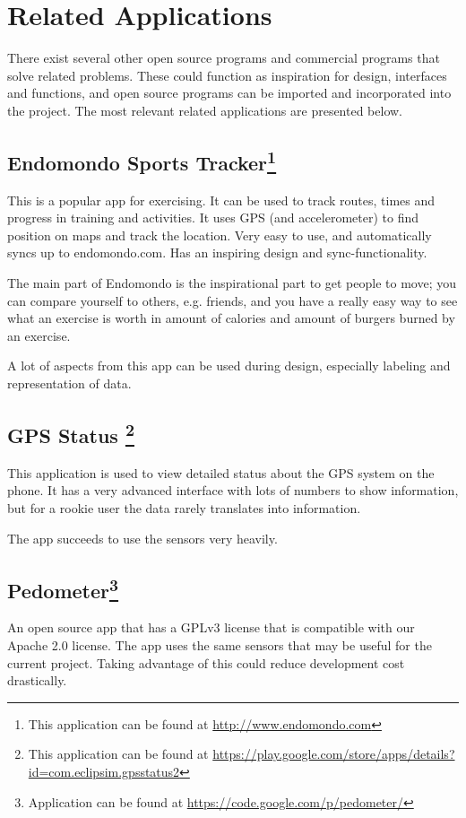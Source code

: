 \section{Related Applications}
There exist several other open source programs and commercial programs that solve related problems. These could function as inspiration for design, interfaces and functions, and open source programs can be imported and incorporated into the project. The most relevant related applications are presented below.

\subsection{Endomondo Sports Tracker\footnote{This application can be found at \url{http://www.endomondo.com}}}
This is a popular app for exercising. It can be used to track routes, times and progress in training and activities. It uses GPS (and accelerometer) to find position on maps and track the location. Very easy to use, and automatically syncs up to endomondo.com. Has an inspiring design and sync-functionality.

The main part of Endomondo is the inspirational part to get people to move; you can compare yourself to others, e.g. friends, and you have a really easy way to see what an exercise is worth in amount of calories and amount of burgers burned by an exercise.

A lot of aspects from this app can be used during design, especially labeling and representation of data.

\subsection{GPS Status \footnote{This application can be found at \url{https://play.google.com/store/apps/details? id=com.eclipsim.gpsstatus2}}}
This application is used to view detailed status about the GPS system on the phone. It has a very advanced interface with lots of numbers to show information, but for a rookie user the data rarely translates into information.

The app succeeds to use the sensors very heavily.

\subsection{Pedometer\footnote{Application can be found at \url{https://code.google.com/p/pedometer/}}}
An open source app that has a GPLv3 license that is compatible with our Apache 2.0 license. The app uses the same sensors that may be useful for the current project. Taking advantage of this could reduce development cost drastically.

